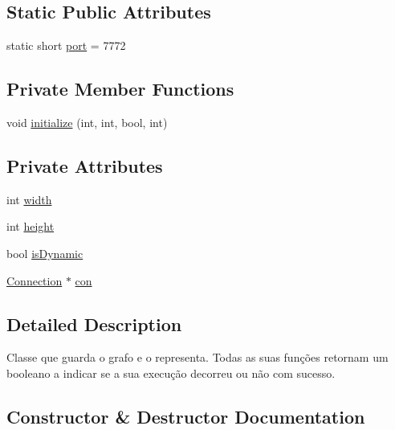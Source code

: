 \subsection*{Static Public Attributes}
\begin{DoxyCompactItemize}
\item 
static short \mbox{\hyperlink{class_graph_viewer_a89d0abe75f41feededc49497cc514342}{port}} = 7772
\end{DoxyCompactItemize}
\subsection*{Private Member Functions}
\begin{DoxyCompactItemize}
\item 
void \mbox{\hyperlink{class_graph_viewer_a1ce9dff4903c650d3b2d33a3ef1d1f61}{initialize}} (int, int, bool, int)
\end{DoxyCompactItemize}
\subsection*{Private Attributes}
\begin{DoxyCompactItemize}
\item 
int \mbox{\hyperlink{class_graph_viewer_a5de27a1d20968b8494cd4bf5a4eb27e1}{width}}
\item 
int \mbox{\hyperlink{class_graph_viewer_a9a1000e492a66ac4301c7135275690da}{height}}
\item 
bool \mbox{\hyperlink{class_graph_viewer_a9d9947154bc63354c6d02a0680aad952}{is\+Dynamic}}
\item 
\mbox{\hyperlink{class_connection}{Connection}} $\ast$ \mbox{\hyperlink{class_graph_viewer_a14a206f78c242e739e0908b06070ba4d}{con}}
\end{DoxyCompactItemize}


\subsection{Detailed Description}
Classe que guarda o grafo e o representa. Todas as suas funções retornam um booleano a indicar se a sua execução decorreu ou não com sucesso. 

\subsection{Constructor \& Destructor Documentation}
\mbox{\label{class_graph_viewer_a8adc614f4fc290a3efcec7d7ceb1c58a}} 
